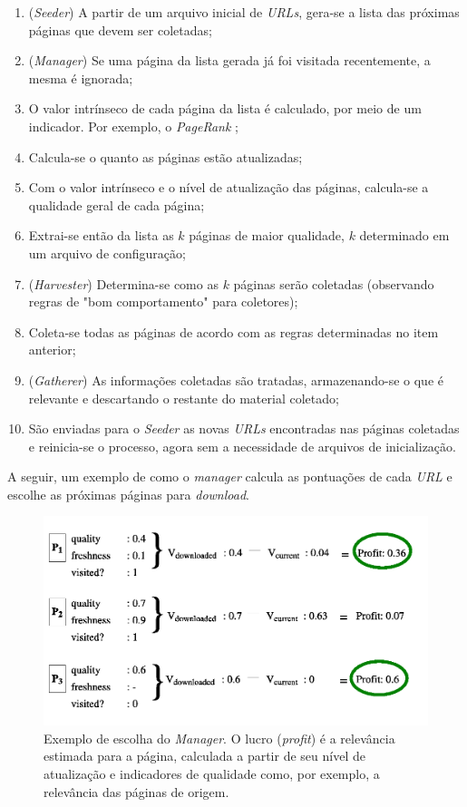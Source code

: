\documentclass[a4paper,12pt,titlepage]{article}
\begin{document}
\begin{enumerate}
\item (\textit{Seeder}) A partir de um arquivo inicial de \textit{URLs}, gera-se a lista das próximas páginas que devem ser coletadas;
\item (\textit{Manager}) Se uma página da lista gerada já foi visitada recentemente, a mesma é ignorada;
\item O valor intrínseco de cada página da lista é calculado, por meio de um indicador. Por exemplo, o \textit{PageRank} \cite{pagerank};
\item Calcula-se o quanto as páginas estão atualizadas;
\item Com o valor intrínseco e o nível de atualização das páginas, calcula-se a qualidade geral de cada página;
\item Extrai-se então da lista as $k$ páginas de maior qualidade, $k$ determinado em um arquivo de configuração;
\item (\textit{Harvester}) Determina-se como as $k$ páginas serão coletadas (observando regras de "bom comportamento" para coletores);
\item Coleta-se todas as páginas de acordo com as regras determinadas no item anterior;
\item (\textit{Gatherer}) As informações coletadas são tratadas, armazenando-se o que é relevante e descartando o restante do material coletado;
\item São enviadas para o \textit{Seeder} as novas \textit{URLs} encontradas nas páginas coletadas e reinicia-se o processo, agora sem a necessidade de arquivos de inicialização.
\end{enumerate}

A seguir, um exemplo de como o \textit{manager} calcula as pontuações de cada \textit{URL} e escolhe as próximas páginas para \textit{download}.

\begin{figure}[H]
     \centering
     \includegraphics[scale=0.3]{figures/manager.png}
     \caption{Exemplo de escolha do \textit{Manager}. O lucro (\textit{profit}) é a relevância estimada para a página, calculada a partir de seu nível de atualização e indicadores de qualidade como, por exemplo, a relevância das páginas de origem.}
     \label{bsp}
\end{figure}
\end{document}

